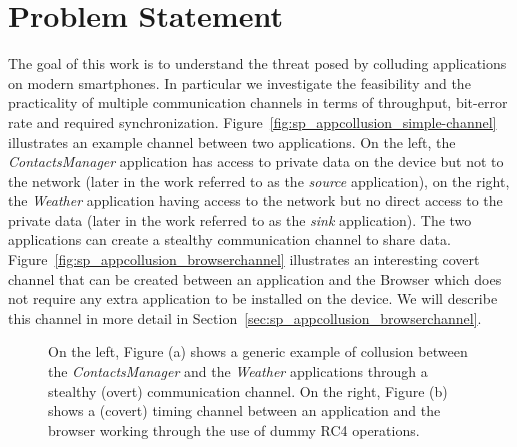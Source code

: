 \section{Problem Statement}
\label{sec:sp_appcollusion_prob-stat}

The goal of this work is to understand the threat posed by colluding
applications on modern smartphones. In particular we investigate the
feasibility and the practicality of multiple communication channels in
terms of throughput, bit-error rate and required
synchronization. Figure~\ref{fig:sp_appcollusion_simple-channel} illustrates an
example channel between two applications. On the left, the
\emph{ContactsManager} application has access to private data on the
device but not to the network (later in the work referred to as the
\emph{source} application), on the right, the \emph{Weather}
application having access to the network but no direct access to the
private data (later in the work referred to as the \emph{sink}
application). The two applications can create a stealthy communication
channel to share data. Figure~\ref{fig:sp_appcollusion_browserchannel} illustrates an
interesting covert channel that can be created between an application
and the Browser which does not require any extra application to be
installed on the device. We will describe this channel in more detail
in Section~\ref{sec:sp_appcollusion_browserchannel}.

\begin{figure}[!ht]
	\centering
	\caption[Examples of overt and covert channels]{On the left, Figure (a) shows a generic example of collusion
between the \emph{ContactsManager} and the \emph{Weather} applications through a stealthy (overt) communication channel. On the right, Figure (b) shows a (covert) timing channel between an application and the browser working through the use of dummy RC4 operations.}
	\label{fig:sp_appcollusion_example-channel}
\end{figure}

